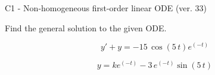 \begin{exercise}
  \begin{exerciseTitle}C1 - Non-homogeneous first-order linear ODE (ver. 33)\end{exerciseTitle}
  \begin{exerciseStatement}
    
Find the general solution to the given ODE.

    
\[y'+y= -15 \, \cos\left(5 \, t\right) e^{\left(-t\right)}\]

  \end{exerciseStatement}
  \begin{exerciseAnswer}
    
\[y= k e^{\left(-t\right)} - 3 \, e^{\left(-t\right)} \sin\left(5 \, t\right)\]

  \end{exerciseAnswer}
\end{exercise}